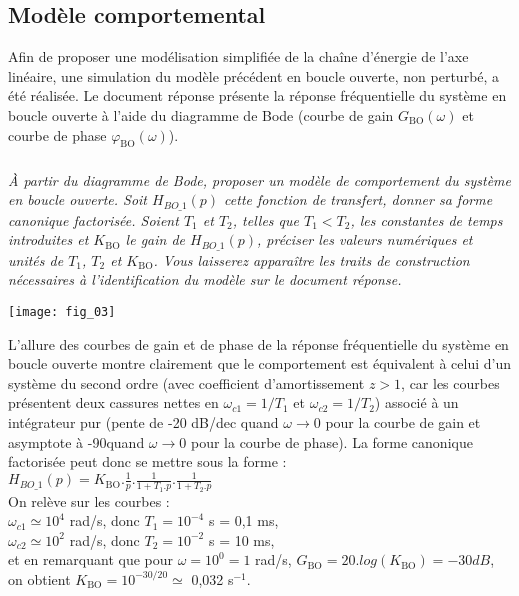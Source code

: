 \begin{multicols}{2}
\subsection*{Modèle comportemental}

\ifprof
\else
Afin de proposer une modélisation simplifiée de la chaîne d'énergie de l'axe linéaire, une simulation du modèle précédent en boucle ouverte, non perturbé, a été réalisée. Le document réponse présente la réponse fréquentielle du système en boucle ouverte à l'aide du diagramme de Bode (courbe de gain $G_{\text{BO}}(\omega)$ et courbe de phase $\varphi_{\text{BO}}(\omega)$). 


\fi



\subparagraph{}\textit{À partir\label{Q_Bode} du diagramme de Bode, proposer un modèle de comportement du système en boucle ouverte. Soit $H_{BO\_1}(p)$ cette fonction de transfert, donner sa forme canonique factorisée. Soient $T_1$ et $T_2$, telles que $T_1 < T_2$, les constantes de temps introduites et $K_{\text{BO}}$ le gain de $H_{BO\_1}(p)$, préciser les valeurs numériques et unités de $T_1$, $T_2$ et $K_{\text{BO}}$. Vous laisserez apparaître les traits de construction nécessaires à l'identification du modèle sur le document réponse.}%

\begin{center}
\texttt{[image: fig\_03]}
\end{center}


\ifprof
\begin{corrige}
L'allure des courbes de gain et de phase de la réponse fréquentielle du système en boucle ouverte montre clairement que le comportement est équivalent à celui d'un système du second ordre (avec coefficient d'amortissement $z>1$, car les courbes présentent deux cassures nettes en $\omega_{c1}=1/T_1$ et $\omega_{c2}=1/T_2$) associé à un intégrateur pur (pente de -20 dB/dec quand $\omega \rightarrow 0$ pour la courbe de gain et asymptote à -90\degre quand $\omega \rightarrow 0$ pour la courbe de phase). La forme canonique factorisée peut donc se mettre sous la forme : \\
$H_{BO\_1}(p) = K_{\text{BO}} . \frac{1}{p}. \frac{1}{1+T_1.p} . \frac{1}{1+T_2.p} $\\
On relève sur les courbes :\\
$\omega_{c1} \simeq 10^4$ rad/s, donc $T_1 = 10^{-4}$ s = 0,1 ms,\\
$\omega_{c2} \simeq 10^2$ rad/s, donc $T_2 = 10^{-2}$ s = 10 ms,\\
et en remarquant que pour $\omega = 10^0=1$ rad/s, $G_{\text{BO}}=20.log(K_{\text{BO}})= -30 dB$, on obtient $ K_{\text{BO}} = 10^{-30/20} \simeq $ 0,032 s$^{-1}$.
 \end{corrige}
\fi



\end{multicols}
